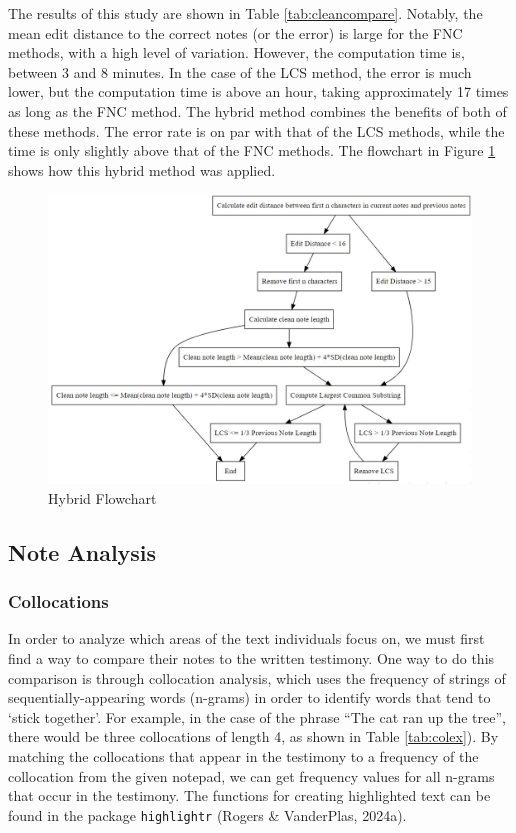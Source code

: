 \documentclass[print]{nuthesis}
\begin{document}
The results of this study are shown in Table \ref{tab:cleancompare}.
Notably, the mean edit distance to the correct notes (or the error) is large for the FNC methods, with a high level of variation.
However, the computation time is, between 3 and 8 minutes.
In the case of the LCS method, the error is much lower, but the computation time is above an hour, taking approximately 17 times as long as the FNC method.
The hybrid method combines the benefits of both of these methods.
The error rate is on par with that of the LCS methods, while the time is only slightly above that of the FNC methods.
The flowchart in Figure \ref{fig:flowchart} shows how this hybrid method was applied.

\begin{figure}

{\centering \includegraphics[width=\linewidth]{images/flowchart} 

}

\caption{Hybrid Flowchart}\label{fig:flowchart}
\end{figure}

\hypertarget{note-analysis}{%
\subsection{Note Analysis}\label{note-analysis}}

\hypertarget{collocations}{%
\subsubsection{Collocations}\label{collocations}}

In order to analyze which areas of the text individuals focus on, we must first find a way to compare their notes to the written testimony.
One way to do this comparison is through collocation analysis, which uses the frequency of strings of sequentially-appearing words (n-grams) in order to identify words that tend to `stick together'.
For example, in the case of the phrase ``The cat ran up the tree'', there would be three collocations of length 4, as shown in Table \ref{tab:colex}).
By matching the collocations that appear in the testimony to a frequency of the collocation from the given notepad, we can get frequency values for all n-grams that occur in the testimony.
The functions for creating highlighted text can be found in the package \texttt{highlightr} (Rogers \& VanderPlas, 2024a).
\end{document}

